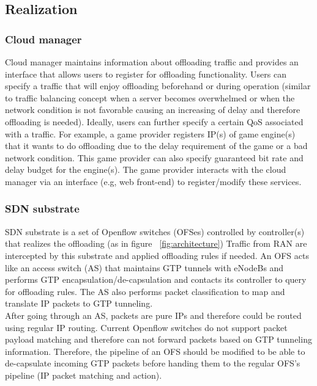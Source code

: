 \subsection{Realization}

\subsubsection{Cloud manager}

Cloud manager maintains information about offloading traffic and provides an 
interface that allows users to register for offloading functionality. Users can specify 
a traffic that will enjoy offloading beforehand or during operation (similar to 
traffic balancing concept when a server becomes overwhelmed or when the network condition is not 
favorable causing an increasing of delay and therefore offloading is needed). 
Ideally, users can further specify a certain QoS associated with a traffic. 
For example, a game provider registers IP(s) of game engine(s) that 
it wants to do offloading due to the delay requirement of the game or a bad network condition. 
This game provider can also specify guaranteed 
bit rate and delay budget for the engine(s). The game provider interacts with the cloud manager 
via an interface (e.g, web front-end) to register/modify these services.

\subsubsection{SDN substrate}

SDN substrate is a set of Openflow switches (OFSes) controlled by controller(s) that 
realizes the offloading (as in figure ~\ref{fig:architecture})
Traffic from RAN are intercepted by this substrate and applied offloading rules if 
needed. An OFS acts like an access switch (AS) that 
maintains GTP tunnels with eNodeBs and performs GTP encapsulation/de-capsulation 
and contacts its controller to query for offloading rules. The AS also 
performs packet classification to map and translate IP packets to GTP tunneling.\\

After going through an AS, packets are pure IPs and therefore could be routed 
using regular IP routing. Current Openflow switches do not support 
packet payload matching and therefore can not forward 
packets based on GTP tunneling information. Therefore, the pipeline of an OFS should be 
modified to be able to de-capsulate incoming GTP packets before handing them to 
the regular OFS's pipeline (IP packet matching and action).\\

